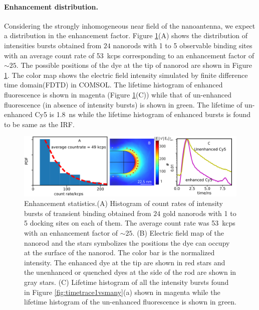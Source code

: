 \paragraph*{Enhancement distribution.}
Considering the strongly inhomogeneous near field of the nanoantenna, we expect a distribution in the enhancement factor.
Figure \ref{fig:int_lt_distribution}(A) shows the distribution of intensities bursts obtained from $24$ nanorods with 1 to 5 observable binding sites with an average count rate of \SI{53}{kcps} corresponding to an enhancement factor of $\sim25$.
The possible positions of the dye at the tip of nanorod are shown in Figure \ref{fig:int_lt_distribution}.
The color map shows the electric field intensity simulated by finite difference time domain(FDTD) in COMSOL.
The lifetime histogram of enhanced fluorescence is shown in magenta (Figure \ref{fig:int_lt_distribution}(C)) while that of un-enhanced fluorescence (in absence of intensity bursts) is shown in green.
The lifetime of un-enhanced Cy5 is \SI{1.8}{\ns} while the lifetime histogram of enhanced bursts is found to be same as the IRF.
\begin{figure}[ht]
	\centering
	\includegraphics[width=\textwidth]{lifetime_scatplot}
	\caption{Enhancement statistics.(A) Histogram of count rates of intensity bursts of transient binding obtained from $24$ gold nanorods with 1 to 5 docking sites on each of them.
	The average count rate was \SI{53}{ kcps} with an enhancement factor of $\sim 25$.
	(B) Electric field map of the nanorod and the stars symbolizes the positions the dye can occupy at the surface of the nanorod.
	The color bar is the normalized intensity.
	The enhanced dye at the tip are shown in red stars and the unenhanced or quenched dyes at the side of the rod are shown in gray stars.
	(C) Lifetime histogram of all the intensity bursts found in Figure \ref{fig:timetrace1vsmany}(a) shown in magenta while the lifetime histogram of the un-enhanced fluorescence is shown in green.
	}
  	\label{fig:int_lt_distribution}
\end{figure}

